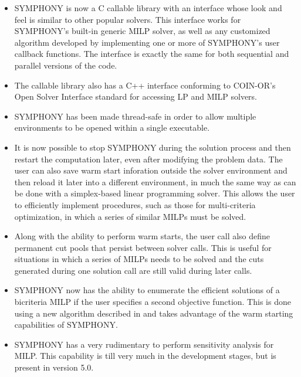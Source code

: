 \begin{itemize}

\item SYMPHONY is now a C callable library with an interface whose look and
feel is similar to other popular solvers. This interface works for SYMPHONY's
built-in generic MILP solver, as well as any customized algorithm developed by
implementing one or more of SYMPHONY's user callback functions. The interface
is exactly the same for both sequential and parallel versions of the code.

\item The callable library also has a C++ interface conforming to COIN-OR's
Open Solver Interface standard for accessing LP and MILP solvers.

\item SYMPHONY has been made thread-safe in order to allow multiple
environments to be opened within a single executable.

\item It is now possible to stop SYMPHONY during the solution process and then
restart the computation later, even after modifying the problem data. The user
can also save warm start inforation outside the solver environment and then
reload it later into a different environment, in much the same way as can be
done with a simplex-based linear programming solver. This allows the user to
efficiently implement procedures, such as those for multi-criteria
optimization, in which a series of similar MILPs must be solved.

\item Along with the ability to perform warm starts, the user call also define
permanent cut pools that persist between solver calls. This is useful for
situations in which a series of MILPs needs to be solved and the cuts
generated during one solution call are still valid during later calls.

\item SYMPHONY now has the ability to enumerate the efficient solutions of a
bicriteria MILP if the user specifies a second objective function. This is
done using a new algorithm described in \cite{WCN} and takes advantage of the
warm starting capabilities of SYMPHONY.

\item SYMPHONY has a very rudimentary to perform sensitivity analysis for
MILP. This capability is till very much in the development stages, but is
present in version 5.0.

\end{itemize}

